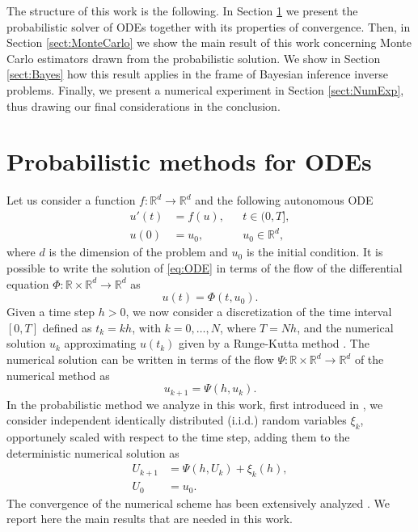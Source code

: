 \documentclass{siamart1116}
\numberwithin{theorem}{section}
\newcommand{\R}{\mathbb{R}}
\begin{document}
The structure of this work is the following. In Section \ref{sect:ProbMethod} we present the probabilistic solver of ODEs together with its properties of convergence. Then, in Section \ref{sect:MonteCarlo} we show the main result of this work concerning Monte Carlo estimators drawn from the probabilistic solution. We show in Section \ref{sect:Bayes} how this result applies in the frame of Bayesian inference inverse problems. Finally, we present a numerical experiment in Section \ref{sect:NumExp}, thus drawing our final considerations in the conclusion.

\section{Probabilistic methods for ODEs}\label{sect:ProbMethod}
Let us consider a function $f\colon \R^d \to \R^d$ and the following autonomous ODE
\begin{equation}\label{eq:ODE}
\begin{aligned}
	u'(t) &= f(u), &&  t \in (0, T], \\
	u(0)  &= u_0, && u_0 \in \R^d,
\end{aligned}
\end{equation}
where $d$ is the dimension of the problem and $u_0$ is the initial condition. It is possible to write the solution of \eqref{eq:ODE} in terms of the flow of the differential equation $\Phi\colon\R\times\R^d\to\R^d$ as
\begin{equation}
	u(t) = \Phi(t, u_0).
\end{equation}
Given a time step $h >0$, we now consider a discretization of the time interval $[0, T]$ defined as $t_k = kh$, with $k = 0, \ldots, N$, where $T = Nh$, and the numerical solution $u_k$ approximating $u(t_k)$ given by a Runge-Kutta method \cite{HLW02}. The numerical solution can be written in terms of the flow $\Psi\colon\R\times\R^d\to\R^d$ of the numerical method as
\begin{equation}
	u_{k+1} = \Psi(h, u_k).
\end{equation}
In the probabilistic method we analyze in this work, first introduced in \cite{CGS16}, we consider independent identically distributed (i.i.d.) random variables $\xi_k$, opportunely scaled with respect to the time step, adding them to the deterministic numerical solution as 
\begin{equation}\label{eq:probabilisticMethod}
\begin{aligned}
U_{k+1} &= \Psi(h, U_k) + \xi_k(h), \\
U_0 &= u_0.
\end{aligned}
\end{equation}
The convergence of the numerical scheme has been extensively analyzed \cite{CGS16}. We report here the main results that are needed in this work. 
\end{document}
